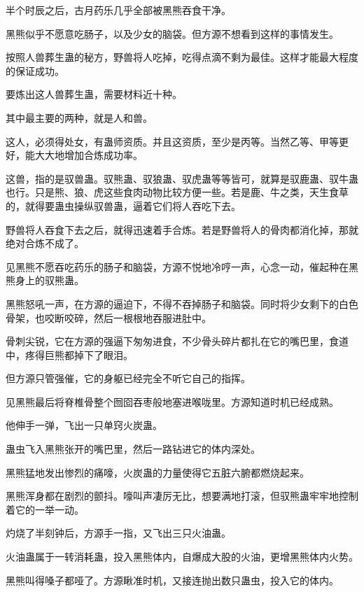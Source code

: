 
\begin{this_body}



半个时辰之后，古月药乐几乎全部被黑熊吞食干净。

黑熊似乎不愿意吃肠子，以及少女的脑袋。但方源不想看到这样的事情发生。

按照人兽葬生蛊的秘方，野兽将人吃掉，吃得点滴不剩为最佳。这样才能最大程度的保证成功。

要炼出这人兽葬生蛊，需要材料近十种。

其中最主要的两种，就是人和兽。

这人，必须得处女，有蛊师资质。并且这资质，至少是丙等。当然乙等、甲等更好，能大大地增加合炼成功率。

这兽，指的是驭兽蛊。驭熊蛊、驭狼蛊、驭虎蛊等等皆可，就算是驭鹿蛊、驭牛蛊也行。只是熊、狼、虎这些食肉动物比较方便一些。若是鹿、牛之类，天生食草的，就得要蛊虫操纵驭兽蛊，逼着它们将人吞吃下去。

野兽将人吞食下去之后，就得迅速着手合炼。若是野兽将人的骨肉都消化掉，那就绝对合炼不成了。

见黑熊不愿吞吃药乐的肠子和脑袋，方源不悦地冷哼一声，心念一动，催起种在黑熊身上的驭熊蛊。

黑熊怒吼一声，在方源的逼迫下，不得不吞掉肠子和脑袋。同时将少女剩下的白色骨架，也咬断咬碎，然后一根根地吞服进肚中。

骨刺尖锐，它在方源的强逼下匆匆进食，不少骨头碎片都扎在它的嘴巴里，食道中，疼得巨熊都掉下了眼泪。

但方源只管强催，它的身躯已经完全不听它自己的指挥。

见黑熊最后将脊椎骨整个囫囵吞枣般地塞进喉咙里。方源知道时机已经成熟。

他伸手一弹，飞出一只单窍火炭蛊。

蛊虫飞入黑熊张开的嘴巴里，然后一路钻进它的体内深处。

黑熊猛地发出惨烈的痛嚎，火炭蛊的力量使得它五脏六腑都燃烧起来。

黑熊浑身都在剧烈的颤抖。嚎叫声凄厉无比，想要满地打滚，但驭熊蛊牢牢地控制着它的一举一动。

灼烧了半刻钟后，方源手一指，又飞出三只火油蛊。

火油蛊属于一转消耗蛊，投入黑熊体内，自爆成大股的火油，更增黑熊体内火势。

黑熊叫得嗓子都哑了。方源瞅准时机，又接连抛出数只蛊虫，投入它的体内。


\end{this_body}
